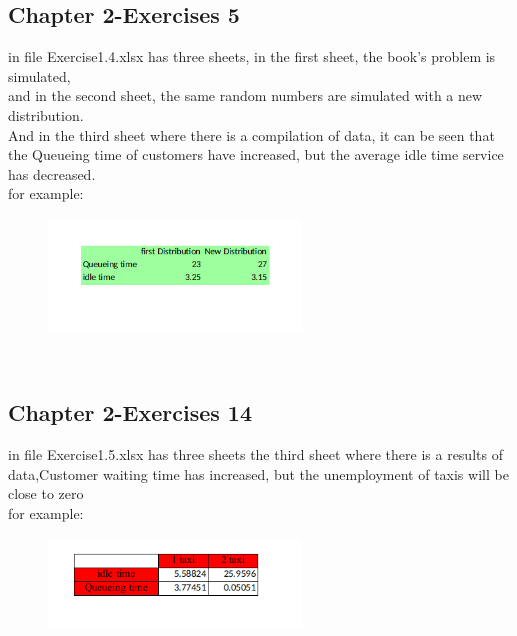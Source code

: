 \documentclass[a4paper,12pt]{article}
\begin{document}
\subsection{Chapter 2-Exercises 5}
in file Exercise1.4.xlsx has three sheets, in the first sheet, the book's problem is simulated, \\
and in the second sheet, the same random numbers are simulated with a new distribution. \\
And in the third sheet where there is a compilation of data, it can be seen that the Queueing time of customers have increased, but the average idle time service has decreased.
\\ for example:
\begin{figure}[h!]
    \centering
    \includegraphics[width=0.6\textwidth]{./Screenshots/Exercise1.4.xlsx.png} 
\end{figure} \\
\newpage

\subsection{Chapter 2-Exercises 14}
in file Exercise1.5.xlsx has three sheets
 the third sheet where there is a results of data,Customer waiting time has increased, but the unemployment of taxis will be close to zero
\\ for example:
\begin{figure}[h!]
    \centering
    \includegraphics[width=0.6\textwidth]{./Screenshots/Exercise1.5.xlsx.png} 
\end{figure} \\
\newpage
\end{document}
